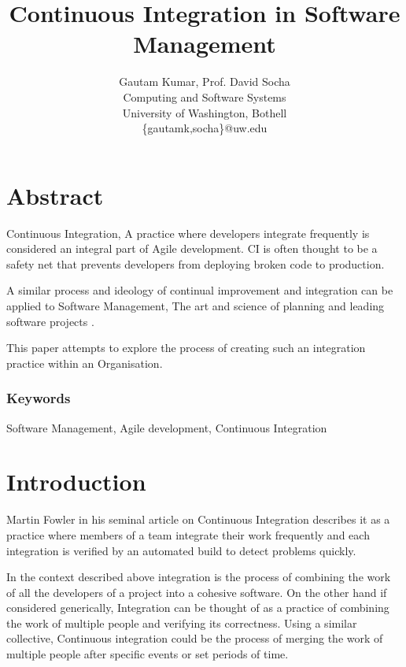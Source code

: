 \documentclass[12pt,conference]{IEEEtran}
\begin{document}
\title{Continuous Integration in Software Management}


\author{
{\rm Gautam Kumar, Prof. David Socha}\\
Computing and Software Systems\\
University of Washington, Bothell\\
\{gautamk,socha\}@uw.edu
} %

\maketitle
\thispagestyle{empty}


\section*{Abstract}
Continuous Integration, A practice where developers integrate 
frequently \cite{stahl_modeling_2014} is considered an integral part of Agile 
development. CI is often thought to be a safety net that prevents developers from deploying broken code to production. 

A similar process and ideology of continual improvement and integration can be applied to Software Management, The art and science of planning and leading software projects \cite{stellman_applied_2005}.

This paper attempts to explore the process of creating such an integration practice within an Organisation.

\subsubsection*{Keywords}

Software Management, Agile development, Continuous Integration

\section*{Introduction}

Martin Fowler in his seminal article \cite{fowler_continuous_2006} on Continuous Integration describes it as a practice where members of a team integrate their work frequently and each integration is verified by an automated build to detect problems quickly.

In the context described above integration is the process of combining the work of all the developers of a project into a cohesive software. On the other hand if considered generically, Integration can be thought of as a practice of combining the work of multiple people and verifying its correctness. Using a similar collective, Continuous integration could be the process of merging the work of multiple people after specific events or set periods of time.
\end{document}
